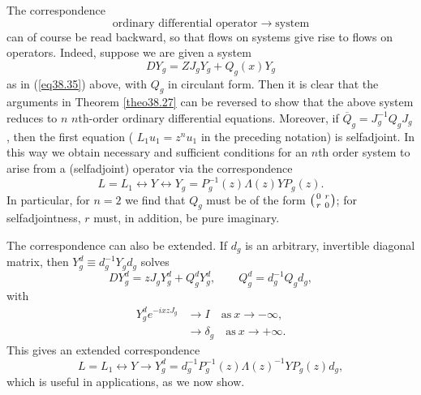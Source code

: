 \documentclass{surv-l}
\theoremstyle{plain}
\theoremstyle{definition}
\numberwithin{equation}{chapter}
\begin{document}
The correspondence
\begin{equation*}
\text{ordinary differential operator} \rightarrow \mathrm{system}
\end{equation*}
can of course be read backward, so that flows on systems give rise to flows on operators. Indeed, suppose we are given a system
\begin{equation*}
DY_{g}=ZJ_{g}Y_{g}+Q_{g}(x)Y_{g}
\end{equation*}
as in (\ref{eq38.35}) above, with $Q_{g}$ in circulant form. Then it is clear that the arguments in Theorem \ref{theo38.27} can be reversed to show that the above system reduces to $n$ $n$th-order ordinary differential equations. Moreover, if $\overline{Q}_{g}=J_{g}^{-1}Q_{g}J_{g}$, then the first equation ( $L_{1}u_{1}=z^{n}u_{1}$ in the preceding notation) is selfadjoint. In this way we obtain necessary and sufficient conditions for an $n$th order system to arise from a (selfadjoint) operator via the correspondence
\begin{equation*}
L=L_{1}\longleftrightarrow Y\longleftrightarrow Y_{g}=P_{g}^{-1}(z)\Lambda(z)YP_{g}(z).
\end{equation*}
In particular, for $n=2$ we find that $Q_{g}$ must be of the form $\left({0 \ r\atop r \ 0}\right)$; for selfadjointness, $r$ must, in addition, be pure imaginary.

The correspondence can also be extended. If $d_{g}$ is an arbitrary, invertible diagonal matrix, then $Y_{g}^{d}\equiv d_{g}^{-1}Y_{g}d_{g}$ solves
\begin{equation*}
DY_{g}^{d}=zJ_{g}Y_{g}^{d}+Q_{g}^{d}Y_{g}^{d},\qquad Q_{g}^{d}=d_{g}^{-1}Q_{g}d_{g},
\end{equation*}
with
\begin{align*}
Y_{g}^{d}e^{-ixzJ_{g}}&\rightarrow I\quad \mathrm{as}\  x\rightarrow-\infty,\\
&\rightarrow\delta_{g}\quad \mathrm{as}\  x\rightarrow+\infty.
\end{align*}
This gives an extended correspondence
\begin{equation*}
L=L_{1}\longleftrightarrow Y\rightarrow Y_{g}^{d}=d_{g}^{-1}P_{g}^{-1}(z)\Lambda(z)^{-1}YP_{g}(z)d_{g},
\end{equation*}
which is useful in applications, as we now show.
\end{document}
